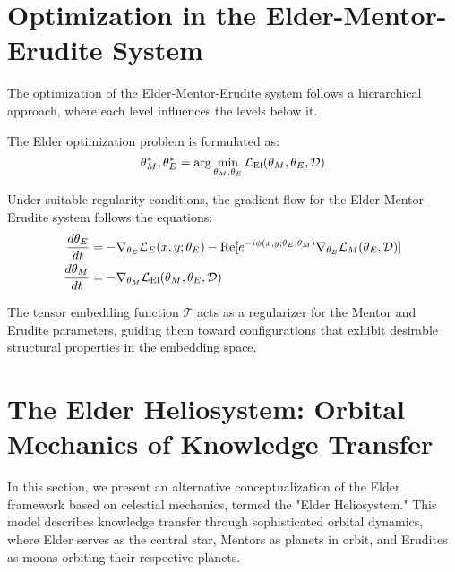 \section{Optimization in the Elder-Mentor-Erudite System}

The optimization of the Elder-Mentor-Erudite system follows a hierarchical approach, where each level influences the levels below it.

\begin{definition}
The Elder optimization problem is formulated as:
\begin{equation}
\theta_M^*, \theta_E^* = \arg\min_{\theta_M, \theta_E} \mathcal{L}_{\text{El}}(\theta_M, \theta_E, \mathcal{D})
\end{equation}
\end{definition}

\begin{theorem}
Under suitable regularity conditions, the gradient flow for the Elder-Mentor-Erudite system follows the equations:
\begin{align}
\frac{d\theta_E}{dt} &= -\nabla_{\theta_E} \mathcal{L}_E(x, y; \theta_E) - \mathrm{Re}[e^{-i\phi(x,y;\theta_E,\theta_M)} \nabla_{\theta_E} \mathcal{L}_M(\theta_E, \mathcal{D})] \\
\frac{d\theta_M}{dt} &= -\nabla_{\theta_M} \mathcal{L}_{\text{El}}(\theta_M, \theta_E, \mathcal{D})
\end{align}
\end{theorem}

\begin{corollary}
The tensor embedding function $\mathcal{T}$ acts as a regularizer for the Mentor and Erudite parameters, guiding them toward configurations that exhibit desirable structural properties in the embedding space.
\end{corollary}

\section{The Elder Heliosystem: Orbital Mechanics of Knowledge Transfer}

In this section, we present an alternative conceptualization of the Elder framework based on celestial mechanics, termed the "Elder Heliosystem." This model describes knowledge transfer through sophisticated orbital dynamics, where Elder serves as the central star, Mentors as planets in orbit, and Erudites as moons orbiting their respective planets.

